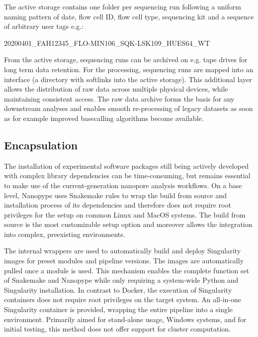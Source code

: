The active storage contains one folder per sequencing run following a uniform naming pattern of date, flow cell ID, flow cell type, sequencing kit and a sequence of arbitrary user tags e.g.:

\begin{center}
	20200401\_FAH12345\_FLO-MIN106\_SQK-LSK109\_HUES64\_WT
\end{center}

From the active storage, sequencing runs can be archived on e.g. tape drives for long term data retention. For the processing, sequencing runs are mapped into an interface (a directory with softlinks into the active storage). This additional layer allows the distribution of raw data across multiple physical devices, while maintaining consistent access.
The raw data archive forms the basis for any downstream analyses and enables smooth re-processing of legacy datasets as soon as for example improved basecalling algorithms become available.

\subsection{Encapsulation}
\label{subsec:nanopype:encapsulation}
The installation of experimental software packages still being actively developed with complex library dependencies can be time-consuming, but remains essential to make use of the current-generation nanopore analysis workflows. On a base level, Nanopype uses Snakemake rules to wrap the build from source and installation process of its dependencies and therefore does not require root privileges for the setup on common Linux and MacOS systems. The build from source is the most customizable setup option and moreover allows the integration into complex, preexisting environments.

The internal wrappers are used to automatically build and deploy Singularity images for preset modules and pipeline versions. The images are automatically pulled once a module is used. This mechanism enables the complete function set of Snakemake and Nanopype while only requiring a system-wide Python and Singularity installation. In contrast to Docker, the execution of Singularity containers does not require root privileges on the target system.
An all-in-one Singularity container is provided, wrapping the entire pipeline into a single environment. Primarily aimed for stand-alone usage, Windows systems, and for initial testing, this method does not offer support for cluster computation. 

